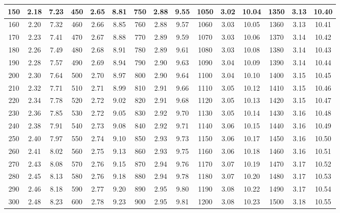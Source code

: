 \documentclass[12pt,a4paper]{article}
\begin{document}
\begin{center}
\begin{tabular}{|c|c|c|c|c|c|c|c|c|c|c|c|c|c|c|}
150 & 2.18 & 7.23 & 450 & 2.65 & 8.81 & 750 & 2.88 & 9.55 & 1050 & 3.02 & 10.04 & 1350 & 3.13 & 10.40 \\ \hline
160 & 2.20 & 7.32 & 460 & 2.66 & 8.85 & 760 & 2.88 & 9.57 & 1060 & 3.03 & 10.05 & 1360 & 3.13 & 10.41 \\ \hline
170 & 2.23 & 7.41 & 470 & 2.67 & 8.88 & 770 & 2.89 & 9.59 & 1070 & 3.03 & 10.06 & 1370 & 3.14 & 10.42 \\ \hline
180 & 2.26 & 7.49 & 480 & 2.68 & 8.91 & 780 & 2.89 & 9.61 & 1080 & 3.03 & 10.08 & 1380 & 3.14 & 10.43 \\ \hline
190 & 2.28 & 7.57 & 490 & 2.69 & 8.94 & 790 & 2.90 & 9.63 & 1090 & 3.04 & 10.09 & 1390 & 3.14 & 10.44 \\ \hline
200 & 2.30 & 7.64 & 500 & 2.70 & 8.97 & 800 & 2.90 & 9.64 & 1100 & 3.04 & 10.10 & 1400 & 3.15 & 10.45 \\ \hline
210 & 2.32 & 7.71 & 510 & 2.71 & 8.99 & 810 & 2.91 & 9.66 & 1110 & 3.05 & 10.12 & 1410 & 3.15 & 10.46 \\ \hline
220 & 2.34 & 7.78 & 520 & 2.72 & 9.02 & 820 & 2.91 & 9.68 & 1120 & 3.05 & 10.13 & 1420 & 3.15 & 10.47 \\ \hline
230 & 2.36 & 7.85 & 530 & 2.72 & 9.05 & 830 & 2.92 & 9.70 & 1130 & 3.05 & 10.14 & 1430 & 3.16 & 10.48 \\ \hline
240 & 2.38 & 7.91 & 540 & 2.73 & 9.08 & 840 & 2.92 & 9.71 & 1140 & 3.06 & 10.15 & 1440 & 3.16 & 10.49 \\ \hline
250 & 2.40 & 7.97 & 550 & 2.74 & 9.10 & 850 & 2.93 & 9.73 & 1150 & 3.06 & 10.17 & 1450 & 3.16 & 10.50 \\ \hline
260 & 2.41 & 8.02 & 560 & 2.75 & 9.13 & 860 & 2.93 & 9.75 & 1160 & 3.06 & 10.18 & 1460 & 3.16 & 10.51 \\ \hline
270 & 2.43 & 8.08 & 570 & 2.76 & 9.15 & 870 & 2.94 & 9.76 & 1170 & 3.07 & 10.19 & 1470 & 3.17 & 10.52 \\ \hline
280 & 2.45 & 8.13 & 580 & 2.76 & 9.18 & 880 & 2.94 & 9.78 & 1180 & 3.07 & 10.20 & 1480 & 3.17 & 10.53 \\ \hline
290 & 2.46 & 8.18 & 590 & 2.77 & 9.20 & 890 & 2.95 & 9.80 & 1190 & 3.08 & 10.22 & 1490 & 3.17 & 10.54 \\ \hline
300 & 2.48 & 8.23 & 600 & 2.78 & 9.23 & 900 & 2.95 & 9.81 & 1200 & 3.08 & 10.23 & 1500 & 3.18 & 10.55 \\ \hline
\end{tabular}
\end{center}
\end{document}
